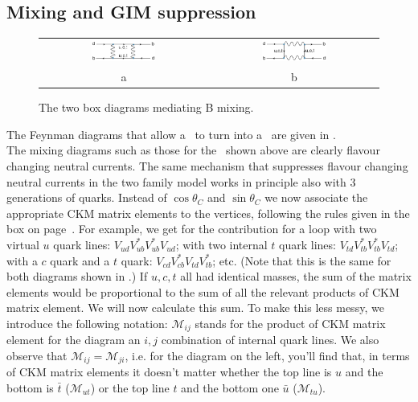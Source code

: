 \subsection{Mixing and GIM suppression}
\begin{figure}
\begin{tabular}{cc}
\includegraphics[width=0.4\textwidth]{fig/C_P_CP/BMix1}
&
\includegraphics[width=0.4\textwidth]{fig/C_P_CP/BMix2}
\\ a & b
\end{tabular}
\caption{The two box diagrams mediating B mixing.\label{fig:BMixingDiagrams}}
\end{figure}
The Feynman diagrams that allow a \Bo\ to turn into a \Bob\ are given in 
.\\
The mixing diagrams such as those for the \Bo\ shown above are clearly flavour changing neutral currents. The same mechanism that suppresses flavour changing neutral currents in the two family model works in principle also with 3 generations of quarks. Instead of $\cos\theta_C$ and $\sin\theta_C$ we now associate the appropriate CKM matrix elements to the vertices, following the rules given in the box on page~\pageref{box:CKMVertices}. For example, we get for the contribution for a loop with two virtual $u$ quark lines: $V_{ud} V_{ub}^* V_{ub}^* V_{ud}$; with two internal $t$ quark lines: $V_{td} V_{tb}^* V_{tb}^* V_{td}$; with a $c$ quark and a $t$ quark: 
$V_{cd} V_{cb}^* V_{td} V_{tb}^*$; etc.
(Note that this is the same for both diagrams shown in .) If $u, c, t$ all had identical masses, the sum of the matrix elements would be proportional to the sum of all the relevant products of CKM matrix element. We will now calculate this sum. To make this less messy, we introduce the following notation: $\mathcal{M}_{ij}$ stands for the product of CKM matrix element for the diagram an $i, j$ combination of internal quark lines. We also observe that $\mathcal{M}_{ij} = \mathcal{M}_{ji}$, i.e. for the diagram on the left, you'll find that, in terms of CKM matrix elements it doesn't matter whether the top line is $u$ and the bottom is $\bar{t}$ ($\mathcal{M}_{ut}$) or the top line $t$ and the bottom one $\bar{u}$ ($\mathcal{M}_{tu}$).
